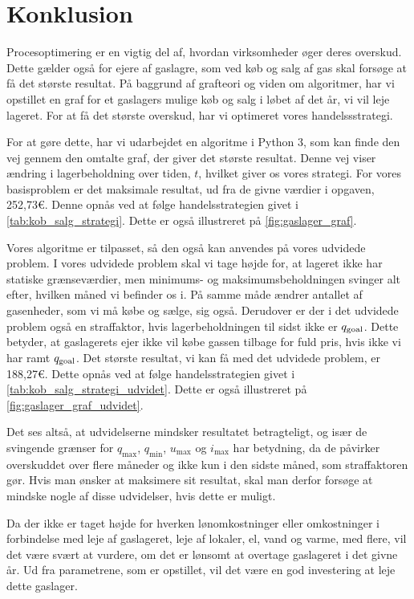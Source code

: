 \chapter{Konklusion}
Procesoptimering er en vigtig del af, hvordan virksomheder øger deres overskud. Dette gælder også for ejere af gaslagre, som ved køb og salg af gas skal forsøge at få det største resultat. På baggrund af grafteori og viden om algoritmer, har vi opstillet en graf for et gaslagers mulige køb og salg i løbet af det år, vi vil leje lageret. For at få det største overskud, har vi optimeret vores handelssstrategi. 

For at gøre dette, har vi udarbejdet en algoritme i Python 3, som kan finde den vej gennem den omtalte graf, der giver det største resultat. Denne vej viser ændring i lagerbeholdning over tiden, $t$, hvilket giver os vores strategi. For vores basisproblem er det maksimale resultat, ud fra de givne værdier i opgaven, 252,73€. Denne opnås ved at følge handelsstrategien givet i \autoref{tab:kob_salg_strategi}. Dette er også illustreret på \autoref{fig:gaslager_graf}. 

Vores algoritme er tilpasset, så den også kan anvendes på vores udvidede problem. I vores udvidede problem skal vi tage højde for, at lageret ikke har statiske grænseværdier, men minimums- og maksimumsbeholdningen svinger alt efter, hvilken måned vi befinder os i. På samme måde ændrer antallet af gasenheder, som vi må købe og sælge, sig også. Derudover er der i det udvidede problem også en straffaktor, hvis lagerbeholdningen til sidst ikke er $q_{\textrm{goal}}$. Dette betyder, at gaslagerets ejer ikke vil købe gassen tilbage for fuld pris, hvis ikke vi har ramt $q_{\textrm{goal}}$. Det største resultat, vi kan få med det udvidede problem, er 188,27€. Dette opnås ved at følge handelsstrategien givet i \autoref{tab:kob_salg_strategi_udvidet}. Dette er også illustreret på \autoref{fig:gaslager_graf_udvidet}.


Det ses altså, at udvidelserne mindsker resultatet betragteligt, og især de svingende grænser for $q_{\max}$, $q_{\min}$, $u_{\max}$ og $i_{\max}$ har betydning, da de påvirker overskuddet over flere måneder og ikke kun i den sidste måned, som straffaktoren gør. Hvis man ønsker at maksimere sit resultat, skal man derfor forsøge at mindske nogle af disse udvidelser, hvis dette er muligt.

Da der ikke er taget højde for hverken lønomkostninger eller omkostninger i forbindelse med leje af gaslageret, leje af lokaler, el, vand og varme, med flere, vil det være svært at vurdere, om det er lønsomt at overtage gaslageret i det givne år. Ud fra parametrene, som er opstillet, vil det være en god investering at leje dette gaslager. 


